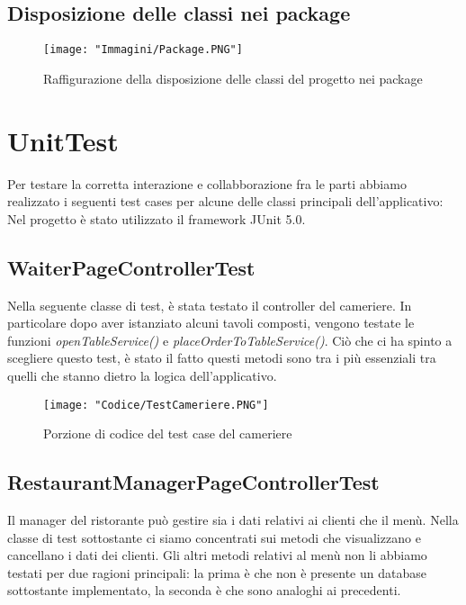 \documentclass{article}
\begin{document}
\subsection{Disposizione delle classi nei package} 

\begin{figure}[!h]
\centering
\texttt{[image: "Immagini/Package.PNG"]}
\caption{Raffigurazione della disposizione delle classi del progetto nei package}
\end{figure}

\newpage

\section{UnitTest}
Per testare la corretta interazione e collabborazione fra le parti abbiamo realizzato i seguenti test cases per alcune delle classi principali dell’applicativo: \\
\newline
Nel progetto \`e stato utilizzato il framework JUnit 5.0.

\subsection{WaiterPageControllerTest}

Nella seguente classe di test, \`e stata testato il controller del cameriere. In particolare dopo aver istanziato alcuni tavoli composti, vengono testate le funzioni \textit{openTableService()} e \textit{placeOrderToTableService()}. Ci\`o che ci ha spinto a scegliere questo test, \`e stato il fatto questi metodi sono tra i pi\`u essenziali tra quelli che stanno dietro la logica dell’applicativo.

\begin{figure}[!h]
\centering
\texttt{[image: "Codice/TestCameriere.PNG"]}
\caption{Porzione di codice del test case del cameriere}
\end{figure}

\newpage

\subsection{RestaurantManagerPageControllerTest}

Il manager del ristorante pu\`o gestire sia i dati relativi ai clienti che il men\`u. Nella classe di test sottostante ci siamo concentrati sui metodi che visualizzano e cancellano i dati dei clienti. Gli altri metodi relativi al men\`u non li abbiamo testati per due ragioni principali: la prima \`e che non \`e presente un database sottostante implementato, la seconda \`e che sono analoghi ai precedenti.
\end{document}
